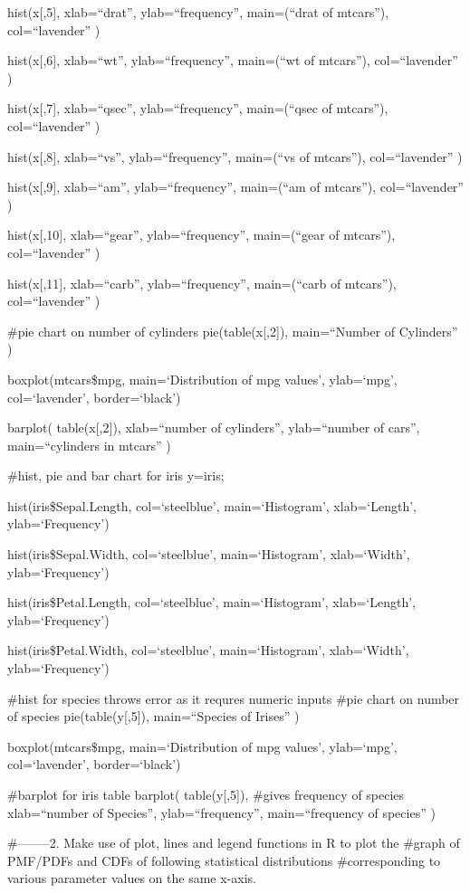 \documentclass[
]{article}
\begin{document}
hist(x{[},5{]}, xlab=``drat'', ylab=``frequency'', main=(``drat of
mtcars''), col=``lavender'' )

hist(x{[},6{]}, xlab=``wt'', ylab=``frequency'', main=(``wt of
mtcars''), col=``lavender'' )

hist(x{[},7{]}, xlab=``qsec'', ylab=``frequency'', main=(``qsec of
mtcars''), col=``lavender'' )

hist(x{[},8{]}, xlab=``vs'', ylab=``frequency'', main=(``vs of
mtcars''), col=``lavender'' )

hist(x{[},9{]}, xlab=``am'', ylab=``frequency'', main=(``am of
mtcars''), col=``lavender'' )

hist(x{[},10{]}, xlab=``gear'', ylab=``frequency'', main=(``gear of
mtcars''), col=``lavender'' )

hist(x{[},11{]}, xlab=``carb'', ylab=``frequency'', main=(``carb of
mtcars''), col=``lavender'' )

\#pie chart on number of cylinders pie(table(x{[},2{]}), main=``Number
of Cylinders'' )

boxplot(mtcars\$mpg, main=`Distribution of mpg values', ylab=`mpg',
col=`lavender', border=`black')

barplot( table(x{[},2{]}), xlab=``number of cylinders'', ylab=``number
of cars'', main=``cylinders in mtcars'' )

\#hist, pie and bar chart for iris y=iris;

hist(iris\$Sepal.Length, col=`steelblue', main=`Histogram',
xlab=`Length', ylab=`Frequency')

hist(iris\$Sepal.Width, col=`steelblue', main=`Histogram', xlab=`Width',
ylab=`Frequency')

hist(iris\$Petal.Length, col=`steelblue', main=`Histogram',
xlab=`Length', ylab=`Frequency')

hist(iris\$Petal.Width, col=`steelblue', main=`Histogram', xlab=`Width',
ylab=`Frequency')

\#hist for species throws error as it requres numeric inputs \#pie chart
on number of species pie(table(y{[},5{]}), main=``Species of Irises'' )

boxplot(mtcars\$mpg, main=`Distribution of mpg values', ylab=`mpg',
col=`lavender', border=`black')

\#barplot for iris table barplot( table(y{[},5{]}), \#gives frequency of
species xlab=``number of Species'', ylab=``frequency'', main=``frequency
of species'' )

\#--------2. Make use of plot, lines and legend functions in R to plot
the \#graph of PMF/PDFs and CDFs of following statistical distributions
\#corresponding to various parameter values on the same x-axis.
\end{document}
